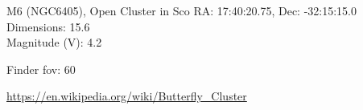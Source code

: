 \begin{block}{M6 (NGC6405), Open Cluster in Sco}
    RA: 17:40:20.75, Dec: -32:15:15.0 \\ 
    Dimensions: 15.6 \\ 
    Magnitude (V): 4.2



    Finder fov: 60 

    \url{https://en.wikipedia.org/wiki/Butterfly_Cluster} 
\end{block}